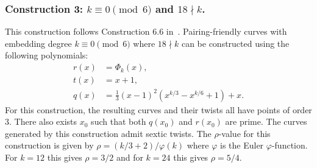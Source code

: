 
\subsubsection{Construction 3: $k \equiv 0 \pmod{6}$ and $18 \nmid k$.}
\label{con3}

This construction follows {Construction 6.6} in~\cite{2010/freeman}.
Pairing-friendly curves with embedding degree $k \equiv 0 \pmod{6}$ where $18 \nmid k$
can be constructed using the following polynomials:
\begin{align*}
r(x) &= \Phi_k(x),	\\
t(x) &= x+1,		\\
q(x) &= \frac{1}{3} (x-1)^2 (x^{k/3} - x^{k/6} + 1) + x.
\end{align*}
For this construction,
the resulting curves and their twists all have points of order 3.
There also exists $x_0$ such that both $q(x_0)$ and $r(x_0)$ are prime.
The curves generated by this construction admit sextic twists.
The $\rho$-value for this construction is given by $\rho = (k/3+2)/\varphi(k)$
where $\varphi$ is the Euler $\varphi$-function.
For $k=12$ this gives $\rho = 3/2$ and for $k=24$ this gives $\rho = 5/4$.


